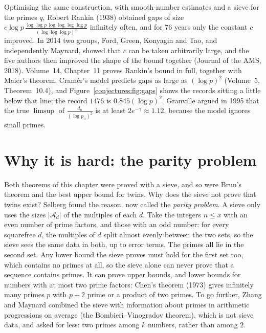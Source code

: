 \begin{remark}
Optimising the same construction, with smooth-number estimates and a sieve for the primes $q$, Robert Rankin (1938) obtained gaps of size
$c\log p\,\frac{\log\log p\,\log\log\log\log p}{(\log\log\log p)^2}$ infinitely often, and for 76 years only the constant $c$ improved. In 2014 two groups,
Ford, Green, Konyagin and Tao, and independently Maynard, showed that $c$ can be taken arbitrarily large, and the five authors then improved the
shape of the bound together (Journal of the AMS, 2018). Volume~14, Chapter~11 proves Rankin's bound in full, together with Maier's theorem. Cram\'er's model predicts gaps as large as $(\log p)^2$ (Volume~5, Theorem~10.4), and
Figure~\ref{conjectures:fig:gaps} shows the records sitting a little below that line; the record $1476$ is $0.845(\log p)^2$. Granville argued in 1995 that the
true $\limsup$ of $\frac{d_n}{(\log p_n)^2}$ is at least $2e^{-\gamma}\approx1.12$, because the model ignores small primes.
\end{remark}

\section{Why it is hard: the parity problem}

Both theorems of this chapter were proved with a sieve, and so were Brun's theorem and the best upper bound for twins. Why does the sieve not prove
that twins exist? Selberg found the reason, now called the \emph{parity problem}. A sieve only uses the sizes $|\mathcal A_d|$ of the multiples of each
$d$. Take the integers $n\le x$ with an even number of prime factors, and those with an odd number: for every squarefree $d$, the multiples of $d$ split
almost evenly between the two sets, so the sieve sees the same data in both, up to error terms. The primes all lie in the second set. Any lower bound
the sieve proves must hold for the first set too, which contains no primes at all, so the sieve alone can never prove that a sequence contains primes.
It can prove upper bounds, and lower bounds for numbers with at most two prime factors: Chen's theorem (1973) gives infinitely many primes $p$ with
$p+2$ prime or a product of two primes. To go further, Zhang and Maynard combined the sieve with information about primes in arithmetic progressions
on average (the Bombieri--\allowbreak Vinogradov theorem), which is not sieve data, and asked for less: two primes among $k$ numbers, rather than among $2$.

